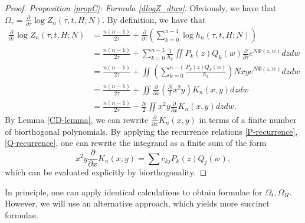 \documentclass[usenames,dvipsnames]{article}
\theoremstyle{definition}
\numberwithin{equation}{section}
\numberwithin{figure}{section}
\begin{document}
\begin{proof} \textit{Proposition \ref{propC}: Formula \eqref{dlogZ_dtau}}.
        Obviously, we have that $\Omega_{\tau} = \frac{\partial}{\partial \tau} \log Z_n(\tau,t,H;N)$. By definition, we have that
        \begin{align*}
            \frac{\partial}{\partial \tau} \log Z_n(\tau,t,H;N) &= \frac{n(n-1)}{2\tau} + \frac{\partial}{\partial \tau} \left(\sum_{k=0}^{n-1}\log h_n(\tau,t,H;N)\right)\\
            &=\frac{n(n-1)}{2\tau} + \sum_{k=0}^{n-1}\frac{1}{h_{k}}\iint P_k(z)Q_k(w)\frac{\partial}{\partial \tau}e^{N\Phi(z,w)} dzdw\\
            &=\frac{n(n-1)}{2\tau} + \iint \left(\sum_{k=0}^{n-1}\frac{ P_k(z)Q_k(w)}{h_{k}}\right) Nxy e^{N\Phi(z,w)} dzdw\\
            &=\frac{n(n-1)}{2\tau} + \iint \frac{\partial}{\partial x} \left(\frac{N}{2}x^2y\right) K_n(x,y) dzdw\\
            &=\frac{n(n-1)}{2\tau} - \frac{N}{2}\iint x^2y\frac{\partial}{\partial x} K_n(x,y) dzdw.
        \end{align*}
    By Lemma \ref{CD-lemma}, we can rewrite $\frac{\partial}{\partial x} K_n(x,y)$ in terms of a finite number of biorthogonal polynomials. By applying the recurrence relations \eqref{P-recurrence}, \eqref{Q-recurrence}, one can rewrite the integrand as a finite sum of the form
        \begin{equation*}
            x^2y\frac{\partial}{\partial x} K_n(x,y) = \sum c_{kj}P_k(z)Q_j(w),
        \end{equation*}
    which can be evaluated explicitly by biorthogonality. 
\end{proof}


In principle, one can apply identical calculations to obtain formulae for $\Omega_{t},\Omega_{H}$. However, we will use an alternative approach, which yields more succinct formulae. 
    
\end{document}
